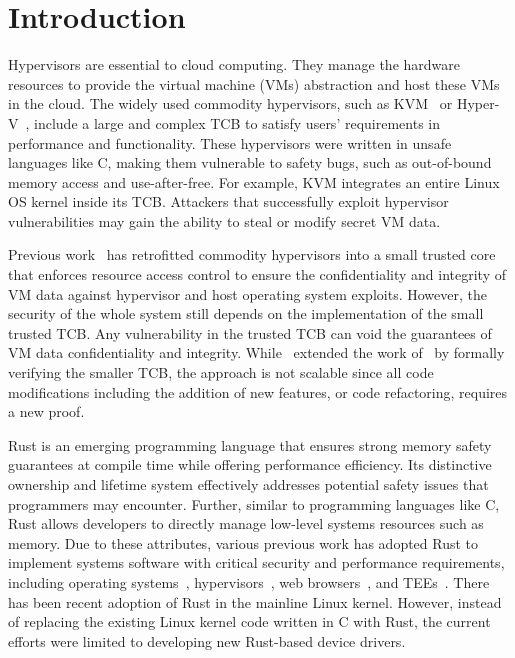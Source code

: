 
\chapter{Introduction}

Hypervisors are essential to cloud computing. They manage the hardware
resources to provide the virtual machine (VMs) abstraction and host
these VMs in the cloud.
The widely used commodity
hypervisors, such as KVM~\cite{kivity07kvm} or Hyper-V~\cite{hyperv},
include a large and complex TCB to satisfy users' requirements in
performance and functionality. These hypervisors were written in unsafe
languages like C, making them vulnerable to safety bugs, such as
out-of-bound memory access and use-after-free. For example, KVM
integrates an entire Linux OS kernel inside its TCB. Attackers that
successfully exploit hypervisor vulnerabilities may gain the ability
to steal or modify secret VM data.

Previous work~\cite{hypsec} has retrofitted commodity hypervisors into a small
trusted core that enforces resource access control to ensure the
confidentiality and integrity of VM data against hypervisor and host operating
system exploits. However, the security of the whole system still depends on the
implementation of the small trusted TCB. Any vulnerability in the trusted TCB
can void the guarantees of VM data confidentiality and integrity.
While~\cite{sekvm} extended the work of~\cite{hypsec} by formally verifying the
smaller TCB, the approach is not scalable since all code modifications
including the addition of new features, or code refactoring, requires a new
proof.

Rust is an emerging programming language that ensures strong memory safety
guarantees at compile time while offering performance efficiency.
Its distinctive ownership and lifetime system
effectively addresses potential safety issues that programmers may encounter.
Further, similar to programming languages like C, Rust allows developers to
directly manage low-level systems resources such as memory. Due to these
attributes, various previous work has adopted Rust to implement systems
software with critical security and performance requirements, including
operating systems~\cite{NrOS, Redleaf, TockOS, theseus},
hypervisors~\cite{DuVisor, RustyHermit}, web browsers~\cite{servo},
and TEEs~\cite{rustsgx,rustee}.
There has been recent adoption of Rust in the mainline Linux kernel. However,
instead of replacing the existing Linux kernel code written in C with Rust,
the current efforts were limited to developing new Rust-based device drivers.

